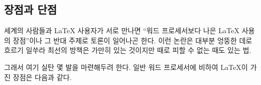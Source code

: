 \subsection{장점과 단점}

{} 세계의 사람들과 \LaTeX{} 사용자가 서로 만나면 ``워드 프로세서보다 나은 \LaTeX{} 사용의 장점''이나
그 반대 주제로 토론이 일어나곤 한다. 이런 논란은 대부분 엉뚱한 데로 흐르기 일쑤라 최선의 방책은 가만히 있는 것이지만 
때로 피할 수 없는 때도 있는 법\hdots\hdots.

\medskip\noindent 그래서 여기 실탄 몇 발을 마련해두려 한다.
일반 워드 프로세서에 비하여 \LaTeX 이 가진 장점은 다음과 같다.


